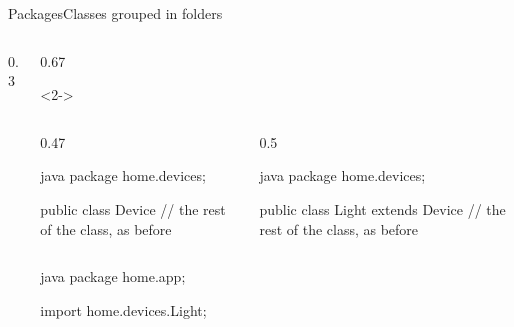 \documentclass[\deckoptions]{beamer}
\begin{document}
\begin{frame}[fragile]{Packages}{Classes grouped in folders}
  \begin{columns}[T, onlytextwidth]
    \begin{column}{0.3\textwidth}
      \begin{explorer}
      \end{explorer}
    \end{column}
    \begin{column}{0.67\textwidth}
      \begin{uncoverenv}<2->
        \begin{columns}[T, onlytextwidth]
          \begin{column}{0.47\linewidth}
\begin{codeblock}[steps={|1|none|none|}, packed, marks={1/2}]{java}
package home.devices;

public class Device {
    // the rest of the class, as before
}
\end{codeblock}
          \end{column}
          \begin{column}{0.5\linewidth}
\begin{codeblock}[steps={|1|none|3|}, packed, marks={1/2, 3/4/info/3}]{java}
package home.devices;

public class Light extends Device {
    // the rest of the class, as before
}
\end{codeblock}
          \end{column}
        \end{columns}
        \blockgap
\begin{codeblock}[steps={|1|3|none|}, packed, marks={1/2, 3/3/info/2}]{java}
package home.app;

import home.devices.Light;


\end{codeblock}
\end{uncoverenv}
\end{column}
\end{columns}
\end{frame}
\end{document}
